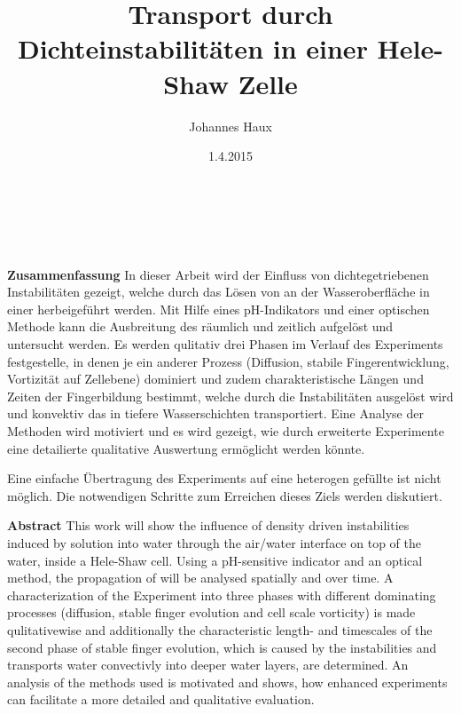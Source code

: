 \documentclass[twoside, a4paper, DIV=11,twocolumn]{book}
\title{Transport durch Dichteinstabilitäten in einer Hele-Shaw Zelle}
\author{Johannes Haux}
\date{1.4.2015}
\begin{document}
\onecolumn

\emptypage

\newpage
{}

\chapter*{\,}

  \noindent \textbf{Zusammenfassung} \hspace{0.3cm} In dieser Arbeit wird der Einfluss von dichtegetriebenen Instabilitäten gezeigt, welche durch das Lösen von \COT an der Wasseroberfläche in einer \HSC herbeigeführt werden. 
  Mit Hilfe eines pH-Indikators und einer optischen Methode kann die Ausbreitung des \COT räumlich und zeitlich aufgelöst und untersucht werden. 
  Es werden qulitativ drei Phasen im Verlauf des Experiments festgestelle, in denen je ein anderer Prozess (Diffusion, stabile Fingerentwicklung, Vortizität auf Zellebene) dominiert und zudem charakteristische Längen und Zeiten der Fingerbildung bestimmt, welche durch die Instabilitäten ausgelöst wird und konvektiv das \COT in tiefere Wasserschichten transportiert.
  Eine Analyse der Methoden wird motiviert und es wird gezeigt, wie durch erweiterte Experimente eine detailierte qualitative Auswertung ermöglicht werden könnte.
  
  Eine einfache Übertragung des Experiments auf eine heterogen gefüllte \HSC ist nicht möglich. Die notwendigen Schritte zum Erreichen dieses Ziels werden diskutiert.
  
  \vspace{1.5cm}
 
  \noindent \textbf{Abstract} \hspace{0.3cm} This work will show the influence of density driven instabilities induced by \COTm solution into water through the air/water interface on top of the water, inside a Hele-Shaw cell. 
  Using a pH-sensitive indicator and an optical method, the propagation of \COT will be analysed spatially and over time.
  A characterization of the Experiment into three phases with different dominating processes (diffusion, stable finger evolution and cell scale vorticity) is made qulitativewise and additionally the characteristic length- and timescales of the second phase of stable finger evolution, which is caused by the instabilities and transports water convectivly into deeper water layers, are determined. 
  An analysis of the methods used is motivated and shows, how enhanced experiments can facilitate a more detailed and qualitative evaluation. 
  
\end{document}
